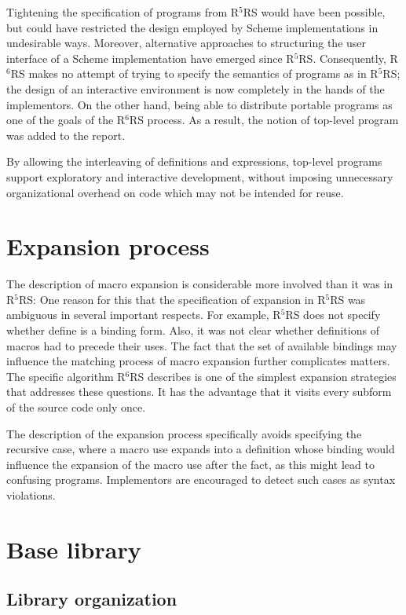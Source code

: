 \documentclass[twoside,twocolumn]{algol60}
\newcommand{\rn}[1]{R$^{#1}$RS}
\begin{document}
Tightening the specification of programs from \rn{5} would have been
possible, but could have restricted the design employed by Scheme
implementations in undesirable ways.  Moreover, alternative approaches
to structuring the user interface of a Scheme implementation have
emerged since \rn{5}.  Consequently, \rn{6} makes no attempt of trying
to specify the semantics of programs as in \rn{5}; the design of an
interactive environment is now completely in the hands of the
implementors.  On the other hand, being able to distribute portable
programs as one of the goals of the \rn{6} process.  As a result, the
notion of top-level program was added to the report.

By allowing the interleaving of definitions and expressions, top-level 
programs support exploratory and interactive development, without 
imposing unnecessary organizational overhead on code which may not be 
intended for reuse.

\chapter{Expansion process}

The description of macro expansion is considerable more involved than
it was in \rn{5}: One reason for this that the specification of
expansion in \rn{5} was ambiguous in several important respects.  For
example, \rn{5} does not specify whether {\cf define} is a binding
form.  Also, it was not clear whether definitions of macros had to
precede their uses.  The fact that the set of available bindings may
influence the matching process of macro expansion further complicates
matters.  The specific algorithm \rn{6} describes is one of the
simplest expansion strategies that addresses these questions.  It has
the advantage that it visits every subform of the source code only
once.

The description of the expansion process specifically avoids
specifying the recursive case, where a macro use expands into a
definition whose binding would influence the expansion of the macro
use after the fact, as this might lead to confusing programs.
Implementors are encouraged to detect such cases as syntax violations.

\chapter{Base library}

\section{Library organization}
\end{document}
